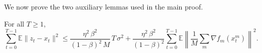 \documentclass{article}
\begin{document}
We now prove the two auxiliary lemmas used in the main proof.

\begin{lemma}
\label{lem:virt_drift}
For all $T \geq 1$,
\begin{equation}
\sum_{t=0}^{T-1}\mathbb{E}\|z_t - x_t\|^2
\leq \frac{\eta^2\,\beta^2}{(1-\beta)^2\,M}\,T\,\sigma^2
   + \frac{\eta^2\,\beta^2}{(1-\beta)^2}\sum_{t=0}^{T-1}
   \mathbb{E}\left\|\frac{1}{M}\sum_m\nabla f_m(x_t^m)\right\|^2.
\label{eq:lem_virt_statement}
\end{equation}
\end{lemma}
\end{document}
